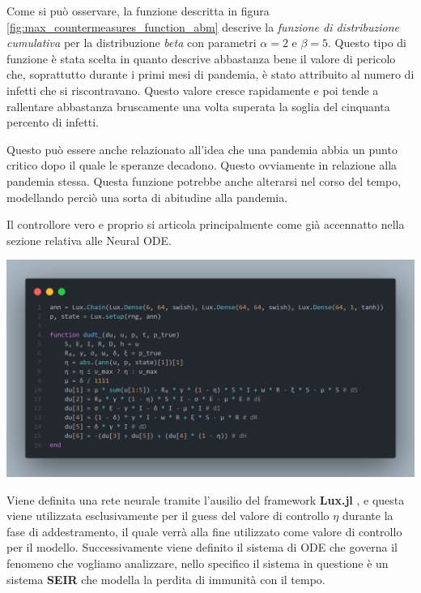Come si può osservare, la funzione descritta in figura \ref{fig:max_countermeasures_function_abm} 
descrive la \emph{funzione di distribuzione cumulativa} per la distribuzione \emph{beta} \cite{wiki:Beta_distribution} 
con parametri $\alpha = 2$ e $\beta = 5$. Questo tipo di funzione è stata scelta in quanto descrive abbastanza 
bene il valore di pericolo che, soprattutto durante i primi mesi di pandemia, è stato attribuito al numero di infetti che 
si riscontravano. Questo valore cresce rapidamente e poi tende a rallentare abbastanza bruscamente una volta superata la 
soglia del cinquanta percento di infetti. 

Questo può essere anche relazionato all'idea che una pandemia abbia un punto critico dopo il quale le speranze decadono. Questo 
ovviamente in relazione alla pandemia stessa. Questa funzione potrebbe anche alterarsi nel corso del tempo, modellando perciò 
una sorta di abitudine alla pandemia. 

Il controllore vero e proprio si articola principalmente come già accennatto nella sezione relativa alle Neural ODE. 

\begin{minipage}{\linewidth}
	\centering
	\includegraphics[width=\textwidth]{img/controller1.png}
	\label{fig:controller1}
\end{minipage}

Viene definita una rete neurale tramite l'ausilio del framework \textbf{Lux.jl} \cite{pal2023lux}, e questa viene utilizzata
esclusivamente per il guess del valore di controllo $\eta$ durante la fase di addestramento, il quale verrà 
alla fine utilizzato come valore di controllo per il modello. Successivamente viene definito il sistema di ODE che governa il fenomeno che vogliamo analizzare, nello specifico il sistema in 
questione è un sistema \textbf{SEIR} che modella la perdita di immunità con il tempo. 

